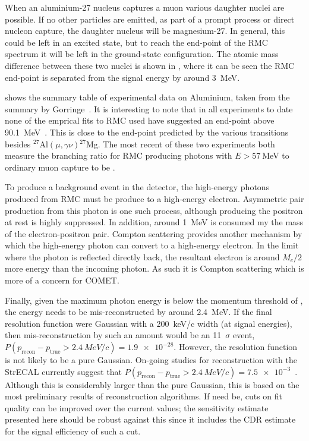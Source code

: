 When an aluminium-27 nucleus captures a muon various daughter nuclei are possible.
If no other particles are emitted, as part of a prompt process or direct nucleon capture, the daughter nucleus will be magnesium-27.
In general, this could be left in an excited state, but to reach the end-point of the \ac{RMC} spectrum it will be left in the ground-state configuration.
The atomic mass difference between these two nuclei is shown in , where it can be seen the RMC end-point is separated from the \mueconv signal energy by around 3~MeV.

\FigRMCExperiments

 shows the summary table of experimental data on Aluminium, taken from the summary by Gorringe~\cite{RevModPhys.76.31}.
It is interesting to note that in all experiments to date none of the emprical fits to RMC used have suggested an end-point above 90.1~MeV~\cite{PhysRevC.37.1633,PhysRevC.46.1094,PhysRevC.59.2853}.
This is close to the end-point predicted by the various transitions besides ${}^{27}$Al$(\mu,\gamma\nu){}^{27}$Mg.
The most recent of these two experiments both measure the branching ratio for \ac{RMC} producing photons with $E>57~$MeV to ordinary muon capture to be . 

To produce a background event in the detector, the high-energy photons produced from RMC must be produce to a high-energy electron.
Asymmetric pair production from this photon is one such process, although producing the positron at rest is highly suppressed.
In addition, around 1~MeV is consumed my the mass of the electron-positron pair.
Compton scattering provides another mechanism by which the high-energy photon can convert to a high-energy electron.
In the limit where the photon is reflected directly back, the resultant electron is around $M_e/2$ more energy than the incoming photon.
As such it is Compton scattering which is more of a concern for COMET.

Finally, given the maximum photon energy is below the momentum threshold of \VarMomThreshold, the energy needs to be mis-reconstructed by around 2.4~MeV.
If the final resolution function were Gaussian with a 200~keV/c width (at signal energies), then mis-reconstruction by such an amount would be an 11~$\sigma$ event, \ie $P(p_\textrm{recon}-p_\textrm{true}>\SI{2.4}{MeV/c})=\num{1.9e-28}$.
However, the resolution function is not likely to be a pure Gaussian.
On-going studies for reconstruction with the  \phaseI StrECAL currently suggest that $P(p_\textrm{recon}-p_\textrm{true}>\SI{2.4}{MeV/c})=\num{7.5e-3}$~\cite{YFujiiStrECALRecon}.
Although this is considerably larger than the pure Gaussian, this is based on the most preliminary results of reconstruction algorithms.
If need be, cuts on fit quality can be improved over the current \phaseI values; the sensitivity estimate presented here should be robust against this since it includes the CDR estimate for the signal efficiency of such a cut.

